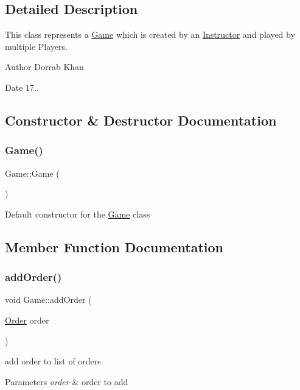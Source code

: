 \subsection{Detailed Description}
This class represents a \hyperlink{classGame}{Game} which is created by an \hyperlink{classInstructor}{Instructor} and played by multiple Players.

\begin{DoxyAuthor}{Author}
Dorrab Khan 
\end{DoxyAuthor}
\begin{DoxyDate}{Date}
17.. 
\end{DoxyDate}


\subsection{Constructor \& Destructor Documentation}
\mbox{\label{classGame_ad59df6562a58a614fda24622d3715b65}} 
\subsubsection{\texorpdfstring{Game()}{Game()}}
{\footnotesize\ttfamily Game\+::\+Game (\begin{DoxyParamCaption}{ }\end{DoxyParamCaption})}

Default constructor for the \hyperlink{classGame}{Game} class 

\subsection{Member Function Documentation}
\mbox{\label{classGame_a0e6b1f8c9d598c7eb860d04c218fa546}} 
\subsubsection{\texorpdfstring{add\+Order()}{addOrder()}}
{\footnotesize\ttfamily void Game\+::add\+Order (\begin{DoxyParamCaption}\item[{\hyperlink{classOrder}{Order}}]{order }\end{DoxyParamCaption})}

add order to list of orders 
\begin{DoxyParams}{Parameters}
{\em order} & order to add \\
\hline
\end{DoxyParams}
\mbox{\label{classGame_a8471ea91ed18fc2d289eb23747d11d39}} 
